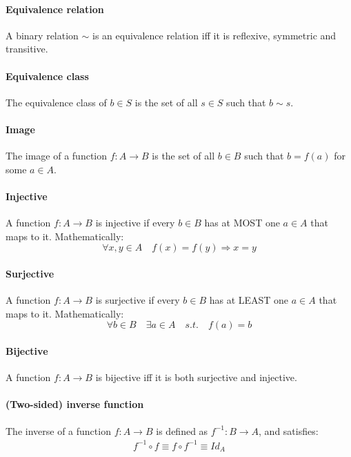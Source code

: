\documentclass{scrartcl}
\begin{document}
\paragraph{Equivalence relation}
A binary relation $ \sim $ is an equivalence relation iff it is reflexive, symmetric and transitive.

\paragraph{Equivalence class}
The equivalence class of $ b \in S $ is the set of all $ s \in S $ such that $ b \sim s $.

\paragraph{Image}
The image of a function $ f: A \to B $ is the set of all $ b \in B $ such that $ b = f(a) $ for some $ a \in A $.

\paragraph{Injective}
A function $ f : A \to B $ is injective if every $ b \in B $ has at MOST one $ a \in A $ that maps to it. Mathematically:
\begin{equation}
\forall x, y \in A \quad f(x) = f(y) \Rightarrow x = y
\end{equation}

\paragraph{Surjective}
A function $ f : A \to B $ is surjective if every $ b \in B $ has at LEAST one $ a \in A $ that maps to it. Mathematically:
\begin{equation}
\forall b \in B \quad \exists a \in A \quad s.t. \quad f(a) = b
\end{equation}

\paragraph{Bijective}
A function $ f : A \to B $ is bijective iff it is both surjective and injective.

\paragraph{(Two-sided) inverse function}
The inverse of a function $ f : A \to B $ is defined as $ f^{-1} : B \to A $, and satisfies:
\begin{align}
f^{-1} \circ f \equiv f \circ f^{-1} \equiv Id_{A}
\end{align}
\end{document}
